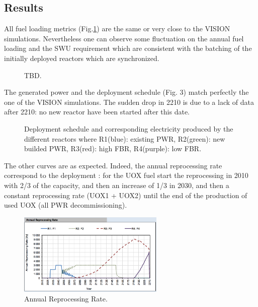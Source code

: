 \documentclass[12pt]{article}
\begin{document}
\subsection{Results}
All fuel loading metrics (Fig.\ref{fig:RessourceUsed}) are the same or very close to the VISION simulations. Nevertheless one can observe some fluctuation on the annual fuel loading and the SWU requirement which are consistent with the batching of the initially deployed reactors which are synchronized.  

\begin{figure}[h!]
\centering
{}
\caption{TBD.\label{fig:RessourceUsed} }
\end{figure}

The generated power and the deployment schedule (Fig. 3)  match perfectly the one of the VISION simulations. The sudden drop in 2210 is due to a lack of data after 2210: no new reactor have been started after this date.\\

\begin{figure}[h!]
\centering
{}
\caption{Deployment schedule and corresponding electricity produced by the different reactors where
 R1(blue): existing PWR, R2(green): new builded PWR, R3(red): high FBR, R4(purple): low FBR.\label{fig:deployment_bis} }
\end{figure}


The other curves are as expected. Indeed, the annual reprocessing rate correspond to the deployment :  for the UOX fuel start the reprocessing in 2010 with 2/3 of the capacity, and then an increase of 1/3 in 2030, and then a constant reprocessing rate (UOX1 + UOX2) until the end of the production of used UOX (all PWR decommissioning).


\begin{figure}[h!]
\centering
\includegraphics[width=0.62\textwidth]	{img/AnnualReprocessingRate_1} 
\caption{Annual Reprocessing Rate.}
 \label{fig:reprocessing_1}
\end{figure}
 
\end{document}
